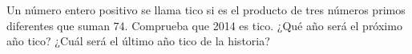 Un número entero positivo se llama tico si es el producto de tres números primos diferentes que suman 74. Comprueba que 2014 es tico. ¿Qué año será el próximo año tico? ¿Cuál será el último año tico de la historia?
